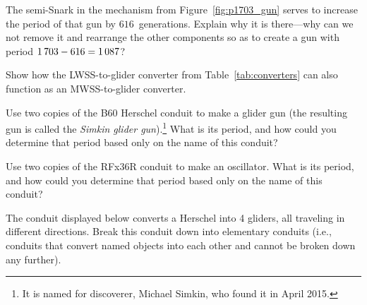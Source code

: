 \begin{multicols}{2}
	
	\mfilbreak
	
	
	\begin{problem}\label{exer:p1703_gun_why_semisnark} 
		The semi-Snark in the mechanism from Figure~\ref{fig:p1703_gun} serves to increase the period of that gun by $616$~generations. Explain why it is there---why can we not remove it and rearrange the other components so as to create a gun with period $1{\,}703 - 616 = 1{\,}087$?
	\end{problem}
	
	
	\mfilbreak
	
	
	\begin{problem}\label{exer:mwss_to_g} 
		Show how the LWSS-to-glider converter from Table~\ref{tab:converters} can also function as an MWSS-to-glider converter.
	\end{problem}
	
	
	\mfilbreak
	
	
	\begin{problemstar}\label{exer:simkin_glider_gun} 
		Use two copies of the B60 Herschel conduit to make a glider gun (the resulting gun is called the \emph{Simkin glider gun}).\footnote{It is named for discoverer, Michael Simkin, who found it in April 2015.} What is its period, and how could you determine that period based only on the name of this conduit?
	\end{problemstar}
	
	
	\mfilbreak
	
	
	\begin{problem}\label{exer:RFx36R_osc} 
		Use two copies of the RFx36R conduit to make an oscillator. What is its period, and how could you determine that period based only on the name of this conduit?
	\end{problem}
	
	
	\mfilbreak
	
	
	\begin{problem}\label{exer:H_to_4G} 
		The conduit displayed below converts a Herschel into 4 gliders, all traveling in different directions. Break this conduit down into elementary conduits (i.e., conduits that convert named objects into each other and cannot be broken down any further).
		
		\begin{center}
		\end{center}
		

\end{problem}
\end{multicols}
